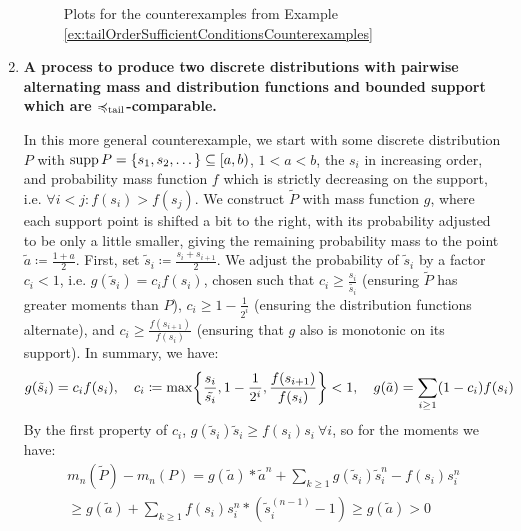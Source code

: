 \documentclass[a4paper]{scrreprt}
\begin{document}
\begin{ex}
\begin{enumerate}
\begin{figure}
                \label{fig:sufficientTailOrderConditionsCounterexamples}
                \caption{Plots for the counterexamples from Example \ref{ex:tailOrderSufficientConditionsCounterexamples}}
            \end{figure}
    
            \item 
            \textbf{A process to produce two discrete distributions with pairwise alternating mass and distribution functions and bounded support which are $\preccurlyeq_{\text{tail}}$-comparable.}
            
            \label{item:discreteSufficientTailOrderConditionCounterexample}
            In this more general counterexample, we start with some discrete distribution $P$ with $\operatorname{supp} P = \{s_1, s_2, \dots\} \subseteq [a, b)$, $1 < a < b$, the $s_i$ in increasing order, and probability mass function $f$ which is strictly decreasing on the support, i.e. $\forall i < j: f(s_i) > f(s_j)$. We construct $\tilde{P}$ with mass function $g$, where each support point is shifted a bit to the right, with its probability adjusted to be only a little smaller, giving the remaining probability mass to the point $\tilde{a} \coloneqq \frac{1+a}{2}$.
            First, set $\tilde{s}_i \coloneqq \frac{s_i+ s_{i+1}}{2}$.
            We adjust the probability of $\tilde{s}_i$ by a factor $c_i < 1$, i.e. $g(\tilde{s}_i) = c_i f(s_i)$, chosen such that $c_i \geq \frac{s_i}{\tilde{s_i}}$ (ensuring $\tilde{P}$ has greater moments than $P$), $c_i \geq 1-\frac{1}{2^i}$ (ensuring the distribution functions alternate), and $c_i \geq \frac{f(s_{i+1})}{f(s_i)}$ (ensuring that $g$ 
            also is monotonic on its support). In summary, we have:            
            \begin{gather*}
                g(\tilde{s}_i) = c_i f(s_i), \quad
                c_i \coloneqq \max\biggl\{\frac{s_i}{\tilde{s_i}}, 1-\frac{1}{2^i}, \frac{f(s_{i+1})}{f(s_i)}\biggr\} < 1, \quad
                g(\tilde{a}) = \sum_{i \geq 1} (1-c_i) f(s_i)
            \end{gather*}
            By the first property of $c_i$, $g(\tilde{s}_i)\tilde{s}_i \geq f(s_i)s_i ~\forall i$, so for the moments we have:
            \begin{multline*}
                m_n(\tilde{P}) - m_n(P)
                = g(\tilde{a})*\tilde{a}^n + \sum_{k \geq 1} g(\tilde{s}_i) \tilde{s}_i^n - f(s_i) s_i^n \\
                \geq g(\tilde{a}) + \sum_{k \geq 1} f(s_i) s_i^n * (\tilde{s}_i^{(n-1)} - 1)
                \geq g(\tilde{a}) > 0
            \end{multline*}
            

\end{enumerate}
\end{ex}
\end{document}
